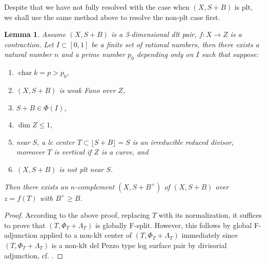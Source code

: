 \documentclass[letterpaper,reqno,12pt]{amsart}
\DeclareMathOperator{\chara}{char}
\numberwithin{equation}{section}
\theoremstyle{plain}
\newtheorem{lemma}[theorem]{Lemma}
\begin{document}
Despite that we have not fully resolved with the case when $(X,S+B)$ is plt, we shall use the same method above to resolve the non-plt case first.
\begin{lemma}
\label{relacomp4}
     Assume $(X,S+B)$ is a 3-dimensional dlt pair, $f:X\to Z$ is a contraction. Let $I\subset[0,1]$ be a finite set of rational numbers, then there exists a natural number $n$ and a prime number $p_0$ depending only on $I$ such that suppose:
     \begin{enumerate}
         \item $\chara k=p>p_0$,
         \item $(X,S+B)$ is weak Fano over $Z$,
         \item $S+B\in \Phi(I)$,
         \item $\dim Z\leq 1$,
         \item near $S$, a lc center $T\subset \lfloor S +B\rfloor=S$ is an irreducible reduced divisor, moreover $T$ is vertical if $Z$ is a curve, and
         \item $(X,S+B)$ is not plt near $S$.
     \end{enumerate}
     Then there exists an $n$-complement $(X,S+B^+)$ of $(X,S+B)$ over $z=f(T)$ with $B^+\geq B$.
\end{lemma}
\begin{proof}
    According to the above proof, replacing $T$ with its normalization, it suffices to prove that $(T,\Phi_T+\Lambda_T)$ is globally F-split. However, this follows by global F-adjunction applied to a non-klt center of $(T,\Phi_T+\Lambda_T)$ immediately since $(T,\Phi_T+\Lambda_T)$ is a non-klt del Pezzo type log surface pair by divisorial adjunction, cf. \cite[Subsection 2.2]{CTW16}.
\end{proof}
\end{document}
